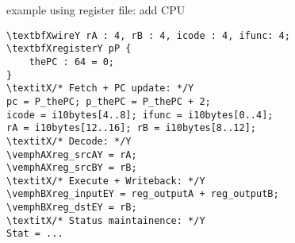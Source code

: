 \begin{frame}[fragile,label=regFileExample]{example using register file: add CPU}
\begin{Verbatim}[fontsize=\fontsize{11}{12}\selectfont,commandchars=\\XY]
\textbfXwireY rA : 4, rB : 4, icode : 4, ifunc: 4;
\textbfXregisterY pP {
    thePC : 64 = 0;
}
\textitX/* Fetch + PC update: */Y
pc = P_thePC; p_thePC = P_thePC + 2;
icode = i10bytes[4..8]; ifunc = i10bytes[0..4];
rA = i10bytes[12..16]; rB = i10bytes[8..12];
\textitX/* Decode: */Y
\vemphAXreg_srcAY = rA;
\vemphAXreg_srcBY = rB;
\textitX/* Execute + Writeback: */Y
\vemphBXreg_inputEY = reg_outputA + reg_outputB;
\vemphBXreg_dstEY = rB;
\textitX/* Status maintainence: */Y
Stat = ...
\end{Verbatim}
\end{frame}

